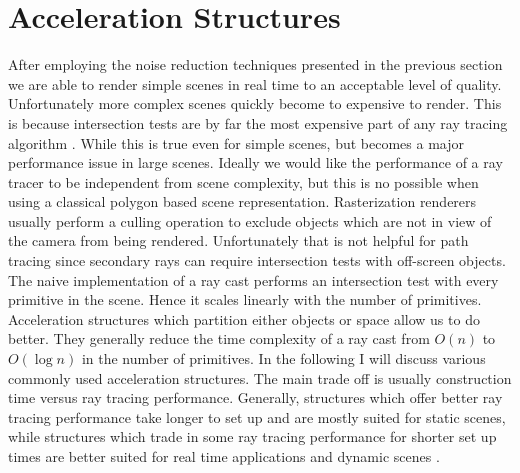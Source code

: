 \documentclass{ACGSeminar}
\begin{document}
\section{Acceleration Structures} \label{acceleration}
After employing the noise reduction techniques presented in the previous section we are able to render simple scenes in real time to an acceptable level of quality. Unfortunately more complex scenes quickly become to expensive to render. This is because intersection tests are by far the most expensive part of any ray tracing algorithm \cite[7]{Whitted:1980}. While this is true even for simple scenes, but becomes a major performance issue in large scenes. Ideally we would like the performance of a ray tracer to be independent from scene complexity, but this is no possible when using a classical polygon based scene representation.
Rasterization renderers usually perform a culling operation to exclude objects which are not in view of the camera from being rendered. Unfortunately that is not helpful for path tracing since secondary rays can require intersection tests with off-screen objects.
The naive implementation of a ray cast performs an intersection test with every primitive in the scene. Hence it scales linearly with the number of primitives. Acceleration structures which partition either objects or space allow us to do better. They generally reduce the time complexity of a ray cast from $O(n)$ to $O(\log n)$ in the number of primitives. In the following I will discuss various commonly used acceleration structures. The main trade off is usually construction time versus ray tracing performance. Generally, structures which offer better ray tracing performance take longer to set up and are mostly suited for static scenes, while structures which trade in some ray tracing performance for shorter set up times are better suited for real time applications and dynamic scenes \cite{Karras:2012:MPC:2383795.2383801}.
\end{document}
